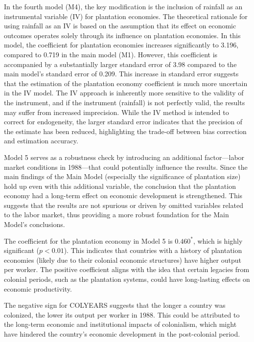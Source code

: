 \documentclass[12pt]{article}
\begin{document}
\vspace{0.3 in} 

\noindent In the fourth model (M4), the key modification is the inclusion of rainfall as an instrumental variable (IV) for plantation economies. The theoretical rationale for using rainfall as an IV is based on the assumption that its effect on economic outcomes operates solely through its influence on plantation economies. In this model, the coefficient for plantation economies increases significantly to 3.196, compared to 0.719 in the main model (M1). However, this coefficient is accompanied by a substantially larger standard error of 3.98 compared to the main model's standard error of 0.209. This increase in standard error suggests that the estimation of the plantation economy coefficient is much more uncertain in the IV model. The IV approach is inherently more sensitive to the validity of the instrument, and if the instrument (rainfall) is not perfectly valid, the results may suffer from increased imprecision. While the IV method is intended to correct for endogeneity, the larger standard error indicates that the precision of the estimate has been reduced, highlighting the trade-off between bias correction and estimation accuracy.

\vspace{0.3 in} 

\noindent Model 5 serves as a robustness check by introducing an additional factor—labor market conditions in 1988—that could potentially influence the results. Since the main findings of the Main Model (especially the significance of plantation size) hold up even with this additional variable, the conclusion that the plantation economy had a long-term effect on economic development is strengthened. This suggests that the results are not spurious or driven by omitted variables related to the labor market, thus providing a more robust foundation for the Main Model's conclusions.

\noindent The coefficient for the plantation economy in Model 5 is \(0.460^*\), which is highly significant (\(p < 0.01\)). This indicates that countries with a history of plantation economies (likely due to their colonial economic structures) have higher output per worker. The positive coefficient aligns with the idea that certain legacies from colonial periods, such as the plantation systems, could have long-lasting effects on economic productivity.

\noindent The negative sign for COLYEARS suggests that the longer a country was colonized, the lower its output per worker in 1988. This could be attributed to the long-term economic and institutional impacts of colonialism, which might have hindered the country's economic development in the post-colonial period.
\end{document}
